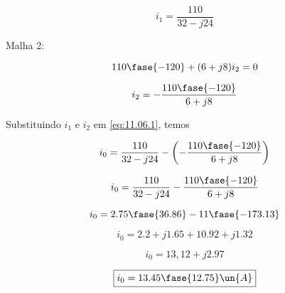 \[ i_1 = \frac{110}{32 - j24} \]

Malha 2:

\[ 110\fase{-120} + (6 +j8)i_2 = 0 \]

\[ i_2 = - \frac{110\fase{-120}}{6 +j8} \]

Substituindo $i_1$ e $i_2$ em \eqref{eq:11.06.1}, temos   

\[  i_0 =  \frac{110}{32 - j24} - \left(- \frac{110\fase{-120}}{6 +j8}\right)  \]

\[  i_0 =  \frac{110}{32 - j24} - \frac{110\fase{-120}}{6 +j8} \]

\[  i_0 =  2.75\fase{36.86} - 11\fase{-173.13}  \]

\[  i_0 =  2.2 + j1.65 +10.92 + j1.32  \]

\[  i_0 =  13,12 + j2.97 \]

\[ \boxed{i_0 = 13.45\fase{12.75} \un{A}} \]

